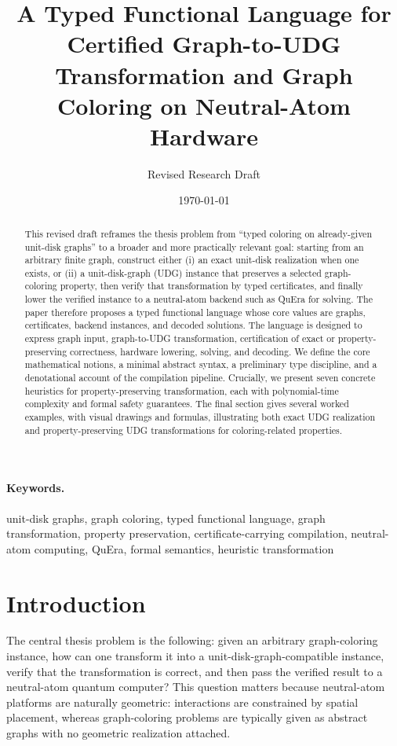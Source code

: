 \documentclass[11pt]{article}
\title{A Typed Functional Language for Certified Graph-to-UDG Transformation and Graph Coloring on Neutral-Atom Hardware}
\author{Revised Research Draft}
\date{\today}
\begin{document}
\maketitle

\begin{abstract}
This revised draft reframes the thesis problem from ``typed coloring on already-given unit-disk graphs'' to a broader and more practically relevant goal: starting from an arbitrary finite graph, construct either (i) an exact unit-disk realization when one exists, or (ii) a unit-disk-graph (UDG) instance that preserves a selected graph-coloring property, then verify that transformation by typed certificates, and finally lower the verified instance to a neutral-atom backend such as QuEra for solving. The paper therefore proposes a typed functional language whose core values are graphs, certificates, backend instances, and decoded solutions. The language is designed to express graph input, graph-to-UDG transformation, certification of exact or property-preserving correctness, hardware lowering, solving, and decoding. We define the core mathematical notions, a minimal abstract syntax, a preliminary type discipline, and a denotational account of the compilation pipeline. Crucially, we present seven concrete heuristics for property-preserving transformation, each with polynomial-time complexity and formal safety guarantees. The final section gives several worked examples, with visual drawings and formulas, illustrating both exact UDG realization and property-preserving UDG transformations for coloring-related properties.
\end{abstract}

\paragraph{Keywords.}
unit-disk graphs, graph coloring, typed functional language, graph transformation, property preservation, certificate-carrying compilation, neutral-atom computing, QuEra, formal semantics, heuristic transformation

\section{Introduction}

The central thesis problem is the following: given an arbitrary graph-coloring instance, how can one transform it into a unit-disk-graph-compatible instance, verify that the transformation is correct, and then pass the verified result to a neutral-atom quantum computer? This question matters because neutral-atom platforms are naturally geometric: interactions are constrained by spatial placement, whereas graph-coloring problems are typically given as abstract graphs with no geometric realization attached.
\end{document}
